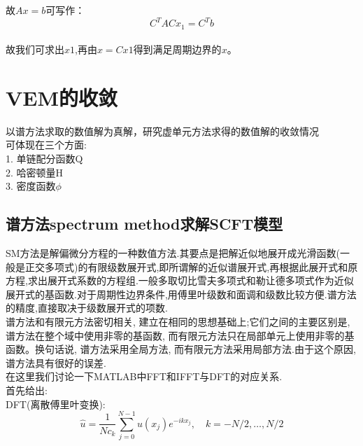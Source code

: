 \documentclass[12pt]{article}
\begin{document}
\begin{CJK}{UTF8}{gkai}
故$Ax=b$可写作：\\
$$C^TACx_1 = C^Tb$$\\

故我们可求出$x1$,再由$x=Cx1$得到满足周期边界的$x$。






    \section{VEM的收敛}
    以谱方法求取的数值解为真解，研究虚单元方法求得的数值解的收敛情况\\
    
    可体现在三个方面:\\
    
    1. 单链配分函数Q\\
    
    2. 哈密顿量H\\
    
    3. 密度函数$\phi$ \\
    
    \subsection{谱方法spectrum method求解SCFT模型}
    
    \qquad SM方法是解偏微分方程的一种数值方法.其要点是把解近似地展开成光滑函数(一般是正交多项式)的有限级数展开式,即所谓解的近似谱展开式,再根据此展开式和原方程,求出展开式系数的方程组.一般多取切比雪夫多项式和勒让德多项式作为近似展开式的基函数.对于周期性边界条件,用傅里叶级数和面调和级数比较方便.谱方法的精度,直接取决于级数展开式的项数.\\
    
    谱方法和有限元方法密切相关, 建立在相同的思想基础上;它们之间的主要区别是, 谱方法在整个域中使用非零的基函数, 而有限元方法只在局部单元上使用非零的基函数。换句话说, 谱方法采用全局方法, 而有限元方法采用局部方法.由于这个原因, 谱方法具有很好的误差.\\
    
    在这里我们讨论一下MATLAB中FFT和IFFT与DFT的对应关系.\\
    
    首先给出:\\
    
    DFT(离散傅里叶变换):\\
    
   $$ \hat{u}=\dfrac{1}{Nc_{k}}\sum_{j=0}^{N-1}u(x_j)e^{-  ikx_j},\quad k=-N/2,\dots,N/2$$
   

\end{CJK}
\end{document}
